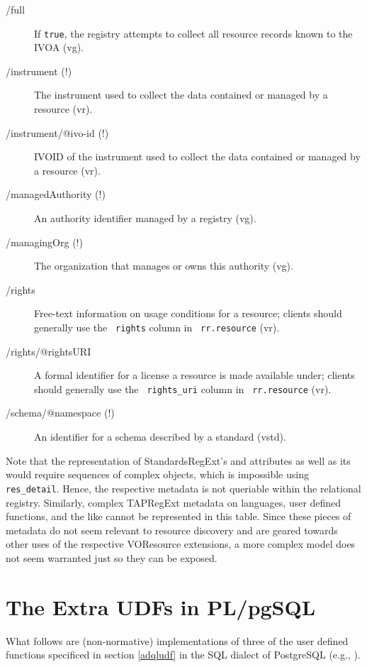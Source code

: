\documentclass[11pt,a4paper]{ivoa}
\newcommand{\rtent}[1]{\texttt{\color{rtcolor} #1}}
\begin{document}
\begin{description}
\item[/full]If \verb|true|, the registry attempts to collect all resource records known to the IVOA (vg).
\item[/instrument (!)]The instrument used to collect the data contained or managed by a resource (vr).
\item[/instrument/@ivo-id (!)]IVOID of the instrument used to collect the data contained or managed by a resource (vr).
\item[/managedAuthority (!)]An authority identifier managed by a registry (vg).
\item[/managingOrg (!)]The organization that manages or owns this authority (vg).
\item[/rights]Free-text information on usage conditions for a resource;
clients should generally use the \rtent{rights} column in
\rtent{rr.resource} (vr).
\item[/rights/@rightsURI]A formal identifier for a license a
resource is made available under; clients should generally use the
\rtent{rights\_uri} column in \rtent{rr.resource} (vr).
\item[/schema/@namespace (!)]An identifier for a schema described by a standard (vstd).

\end{description}

Note that the representation of StandardsRegExt's 
  and 
attributes as well as its  would require sequences of
complex objects, which is impossible using \rtent{res\_detail}.
Hence, the respective metadata is not queriable
within the relational registry. Similarly, complex TAPRegExt metadata on
languages, user defined functions, and the like cannot be
represented in this table.  Since these pieces of metadata do not seem
relevant to resource discovery and are geared towards other uses of the
respective VOResource extensions, a more complex model does not seem
warranted just so they can be exposed.



\section{The Extra UDFs in
PL/pgSQL}

\label{appPGDefs}

What follows are (non-normative) 
implementations of three of the user defined functions
specificed in section \ref{adqludf} in the SQL dialect
of PostgreSQL (e.g., \citet{doc:Postgres92}).
\end{document}
